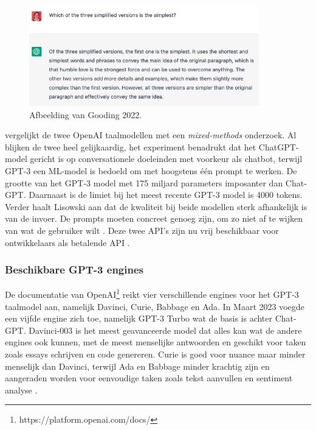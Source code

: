 \begin{figure}[H]
	\includegraphics[width=10cm]{img/chatgpt-example-evaluation-gooding.png}
	\caption{Afbeelding van Gooding 2022.}
\end{figure}

\textcite{Lisowski2023} vergelijkt de twee OpenAI taalmodellen met een \textit{mixed-methods} onderzoek. Al blijken de twee heel gelijkaardig, het experiment benadrukt dat het ChatGPT-model gericht is op conversationele doeleinden met voorkeur als chatbot, terwijl GPT-3 een ML-model is bedoeld om met hoogstens één prompt te werken. De grootte van het GPT-3 model met 175 miljard parameters imposanter dan Chat-GPT. Daarnaast is de limiet bij het meest recente GPT-3 model is 4000 tokens. Verder haalt Lisowski aan dat de kwaliteit bij beide modellen sterk afhankelijk is van de invoer. De prompts moeten concreet genoeg zijn, om zo niet af te wijken van wat de gebruiker wilt \autocite{Lisowski2023}. Deze twee API's zijn nu vrij beschikbaar voor ontwikkelaars als betalende API \autocite{Brockman2023}.

\subsubsection{Beschikbare GPT-3 engines}

De documentatie van OpenAI\footnote{https://platform.openai.com/docs/} reikt vier verschillende engines voor het GPT-3 taalmodel aan, namelijk Davinci, Curie, Babbage en Ada. In Maart 2023 voegde een vijfde engine zich toe, namelijk GPT-3 Turbo wat de basis is achter Chat-GPT. Davinci-003 is het meest geavanceerde model dat alles kan wat de andere engines ook kunnen, met de meest menselijke antwoorden en geschikt voor taken zoals essays schrijven en code genereren. Curie is goed voor nuance maar minder menselijk dan Davinci, terwijl Ada en Babbage minder krachtig zijn en aangeraden worden voor eenvoudige taken zoals tekst aanvullen en sentiment analyse \autocite{Brockman2023}. 

